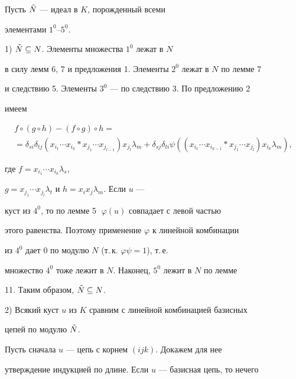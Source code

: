 \begin{pf} Пусть $\Tilde N$ --- идеал в $K$, порожденный всеми


элементами $1^0$--$5^0$.





1) $\Tilde N \subseteq N$. Элементы множества $1^0$ лежат в $N$


в силу лемм 6, 7 и предложения 1. Элементы $2^0$ лежат в $N$ по лемме 7


и следствию 5. Элементы $3^0$ --- по следствию 3. По предложению 2


имеем


\begin{multline*}


f\circ (g\circ h)-(f\circ g)\circ h=\\


%


=\delta _{si}\delta _{tj}(x_{i_1}\dotsb x_{i_k}


* x_{j_1}\dotsb x_{j_{l-1}})x_{j_l}\lambda _m +


\delta _{sj}\delta _{ti}\psi((x_{i_1}\dotsb x_{i_{k-1}}


* x_{j_1}\dotsb x_{j_l})x_{i_k}\lambda _m),


\end{multline*}


где $f=x_{i_1}\dotsb x_{i_k}\lambda _s$, 


$g=x_{j_1}\dotsb x_{j_l}\lambda _t$ и $h=x_ix_j\lambda _m$. Если $u$ ---


куст из $4^0$, то по лемме 5 $\;\varphi (u)$ совпадает с левой частью


этого равенства. Поэтому применение $\varphi $ к линейной комбинации


из $4^0$ дает $0$ по модулю $N$ (т.\,к. $\varphi \psi =1$), т.\,е.


множество $4^0$ тоже лежит в $N$. Наконец, $5^0$ лежит в $N$ по лемме


11. Таким образом, $\Tilde N \subseteq N$.





2) Всякий куст $u$ из $K$ сравним с линейной комбинацией базисных


цепей по модулю $\Tilde N$.





Пусть сначала $u$ --- цепь с корнем $(ijk)$. Докажем для нее


утверждение индукцией по длине. Если $u$ --- базисная цепь, то нечего



\end{pf}
